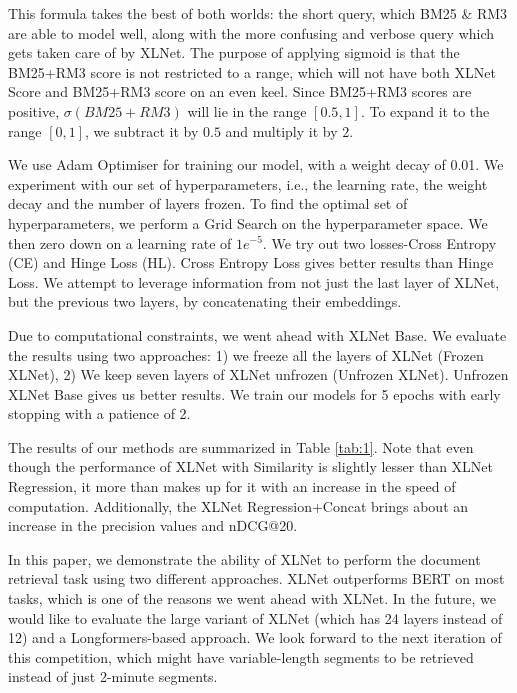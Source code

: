 \documentclass[10pt,twocolumn]{article}
\begin{document}
This formula takes the best of both worlds: the short query, which BM25 \& RM3 are able to model well, along with the more confusing and verbose query which gets taken care of by XLNet. The purpose of applying sigmoid is that the BM25+RM3 score is not restricted to a range, which will not have both XLNet Score and BM25+RM3 score on an even keel. Since BM25+RM3 scores are positive, $\sigma(BM25+RM3)$ will lie in the range $[0.5,1]$. To expand it to the range $[0,1]$, we subtract it by $0.5$ and multiply it by $2$. 


We use Adam Optimiser for training our model, with a weight decay of 0.01. We experiment with our set of hyperparameters, i.e., the learning rate, the weight decay and the number of layers frozen. To find the optimal set of hyperparameters, we perform a Grid Search on the hyperparameter space. We then zero down on a learning rate of $1e^{-5}$. We try out two losses-Cross Entropy (CE) and Hinge Loss (HL). Cross Entropy Loss gives better results than Hinge Loss. We attempt to leverage information from not just the last layer of XLNet, but the previous two layers, by concatenating their embeddings. 

Due to computational constraints, we went ahead with XLNet Base. We evaluate the results using two approaches: 1) we freeze all the layers of XLNet (Frozen XLNet), 2) We keep seven layers of XLNet unfrozen (Unfrozen XLNet). Unfrozen XLNet Base gives us better results. We train our models for 5 epochs with early stopping with a patience of 2. 

The results of our methods are summarized in Table \ref{tab:1}. Note that even though the performance of XLNet with Similarity is slightly lesser than XLNet Regression, it more than makes up for it with an increase in the speed of computation. Additionally, the XLNet Regression+Concat brings about an increase in the precision values and nDCG@20.



In this paper, we demonstrate the ability of XLNet to perform the document retrieval task using two different approaches. XLNet outperforms BERT on most tasks, which is one of the reasons we went ahead with XLNet. In the future, we would like to evaluate the large variant of XLNet (which has 24 layers instead of 12) and a Longformers-based approach. 
We look forward to the next iteration of this competition, which might have variable-length segments to be retrieved instead of just 2-minute segments.


\end{document}
